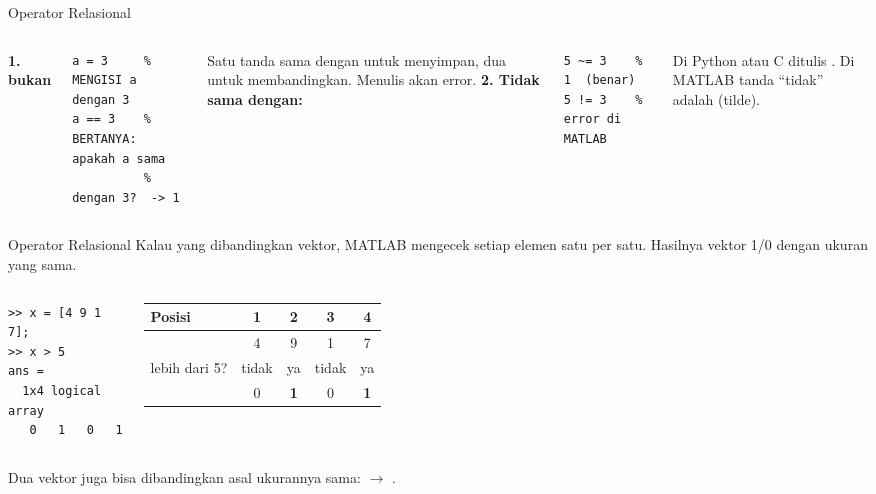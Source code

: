 \documentclass[t,aspectratio=169,11pt]{beamer}
\newcommand{\cc}[1]{\texttt{\detokenize{#1}}}
\begin{document}
\begin{frame}[fragile]{Operator Relasional}
\begin{columns}[T]
\textbf{1. \cc{=} bukan \cc{==}}
\begin{lstlisting}
a = 3     % MENGISI a dengan 3
a == 3    % BERTANYA: apakah a sama
          % dengan 3?  -> 1
\end{lstlisting}
\small Satu tanda sama dengan untuk menyimpan, dua untuk membandingkan.
Menulis \cc{if a = 3} akan error.
\textbf{2. Tidak sama dengan: \cc{~=}}
\begin{lstlisting}
5 ~= 3    % 1  (benar)
5 != 3    % error di MATLAB
\end{lstlisting}
\small Di Python atau C ditulis \cc{!=}. Di MATLAB tanda ``tidak'' adalah \cc{~} (tilde).
\end{columns}
\end{frame}

\begin{frame}[fragile]{Operator Relasional}
Kalau yang dibandingkan vektor, MATLAB mengecek \alert{setiap elemen satu per satu}.
Hasilnya vektor 1/0 dengan ukuran yang sama.

\begin{columns}[T]
\begin{lstlisting}
>> x = [4 9 1 7];
>> x > 5
ans =
  1x4 logical array
   0   1   0   1
\end{lstlisting}
\centering\small
\begin{tabular}{lcccc}
\toprule
Posisi & 1 & 2 & 3 & 4 \\
\midrule
\cc{x}        & 4 & 9 & 1 & 7 \\
lebih dari 5? & tidak & ya & tidak & ya \\
\cc{x > 5}    & 0 & \textbf{1} & 0 & \textbf{1} \\
\bottomrule
\end{tabular}
\end{columns}

\vspace{6pt}
\small Dua vektor juga bisa dibandingkan asal ukurannya sama:
\cc{[4 9 1 7] == [4 0 1 0]} $\to$ \cc{[1 0 1 0]}.
\end{frame}
\end{document}
